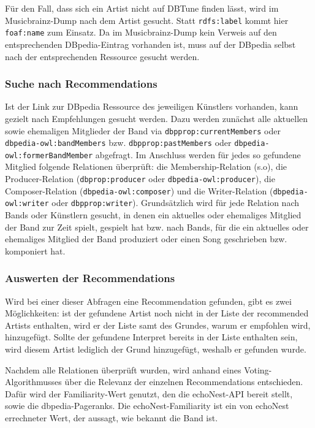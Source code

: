 Für den Fall, dass sich ein Artist nicht auf DBTune finden lässt, wird im Musicbrainz-Dump nach dem Artist gesucht. Statt \texttt{rdfs:label} kommt hier \texttt{foaf:name} zum Einsatz. Da im Musicbrainz-Dump kein Verweis auf den entsprechenden DBpedia-Eintrag vorhanden ist, muss auf der DBpedia selbst nach der entsprechenden Ressource gesucht werden.


\subsubsection{Suche nach Recommendations}
Ist der Link zur DBpedia Ressource des jeweiligen Künstlers vorhanden, kann gezielt nach Empfehlungen gesucht werden. Dazu werden zunächst alle aktuellen sowie ehemaligen Mitglieder der Band via \texttt{dbpprop:currentMembers} oder \texttt{dbpedia-owl:bandMembers}  bzw. \texttt{dbpprop:pastMembers} oder \texttt{dbpedia-owl:formerBandMember} abgefragt. Im Anschluss werden für jedes so gefundene Mitglied folgende Relationen überprüft: die Membership-Relation (s.o), die Producer-Relation (\texttt{dbprop:producer} oder \texttt{dbpedia-owl:producer}), die Composer-Relation (\texttt{dbpedia-owl:composer}) und die Writer-Relation (\texttt{dbpedia-owl:writer} oder \texttt{dbpprop:writer}). Grundsätzlich wird für jede Relation nach Bands oder Künstlern gesucht, in denen ein aktuelles oder ehemaliges Mitglied der Band zur Zeit spielt, gespielt hat bzw. nach Bands, für die ein aktuelles oder ehemaliges Mitglied der Band produziert oder einen Song geschrieben bzw. komponiert hat. 

\subsubsection{Auswerten der Recommendations}
Wird bei einer dieser Abfragen eine Recommendation gefunden, gibt es zwei Möglichkeiten: ist der gefundene Artist noch nicht in der Liste der recommended Artists enthalten, wird er der Liste samt des Grundes, warum er empfohlen wird, hinzugefügt. Sollte der gefundene Interpret bereits in der Liste enthalten sein, wird diesem Artist lediglich der Grund hinzugefügt, weshalb er gefunden wurde. 

Nachdem alle Relationen überprüft wurden, wird anhand eines Voting-Algorithmusses über die Relevanz der einzelnen Recommendations entschieden. Dafür wird der Familiarity-Wert genutzt, den die echoNest-API bereit stellt, sowie die dbpedia-Pageranks. Die echoNest-Familiarity ist ein von echoNest errechneter Wert, der aussagt, wie bekannt die Band ist.\cite{echonest_familiarity}

